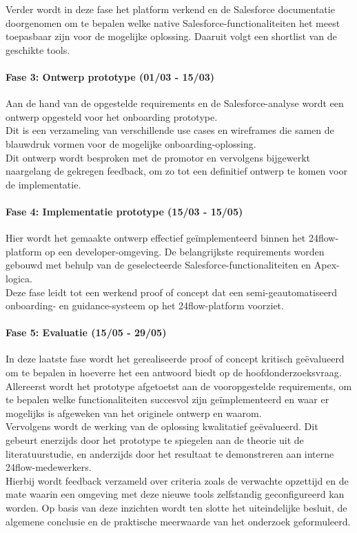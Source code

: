 Verder wordt in deze fase het platform verkend en de Salesforce documentatie doorgenomen om te bepalen welke native Salesforce-functionaliteiten het meest toepasbaar zijn voor de mogelijke oplossing. Daaruit volgt een shortlist van de geschikte tools.

\paragraph{Fase 3: Ontwerp prototype (01/03 - 15/03)}
Aan de hand van de opgestelde requirements en de Salesforce-analyse wordt een ontwerp opgesteld voor het onboarding prototype.
\\

Dit is een verzameling van verschillende use cases en wireframes die samen de blauwdruk vormen voor de mogelijke onboarding-oplossing. 
\\

Dit ontwerp wordt besproken met de promotor en vervolgens bijgewerkt naargelang de gekregen feedback, om zo tot een definitief ontwerp te komen voor de implementatie.

\paragraph{Fase 4: Implementatie prototype (15/03 - 15/05)}
Hier wordt het gemaakte ontwerp effectief geïmplementeerd binnen het 24flow-platform op een developer-omgeving. De belangrijkste requirements worden gebouwd met behulp van de geselecteerde Salesforce-functionaliteiten en Apex-logica.
\\

Deze fase leidt tot een werkend proof of concept dat een semi-geautomatiseerd onboarding- en guidance-systeem op het 24flow-platform voorziet.

\paragraph{Fase 5: Evaluatie (15/05 - 29/05)}
In deze laatste fase wordt het gerealiseerde proof of concept kritisch geëvalueerd om te bepalen in hoeverre het een antwoord biedt op de hoofdonderzoeksvraag.
\\

Allereerst wordt het prototype afgetoetst aan de vooropgestelde requirements, om te bepalen welke functionaliteiten succesvol zijn geïmplementeerd en waar er mogelijks is afgeweken van het originele ontwerp en waarom. 
\\

Vervolgens wordt de werking van de oplossing kwalitatief geëvalueerd. Dit gebeurt enerzijds door het prototype te spiegelen aan de theorie uit de literatuurstudie, en anderzijds door het resultaat te demonstreren aan interne 24flow-medewerkers. 
\\

Hierbij wordt feedback verzameld over criteria zoals de verwachte opzettijd en de mate waarin een omgeving met deze nieuwe tools zelfstandig geconfigureerd kan worden. Op basis van deze inzichten wordt ten slotte het uiteindelijke besluit, de algemene conclusie en de praktische meerwaarde van het onderzoek geformuleerd.